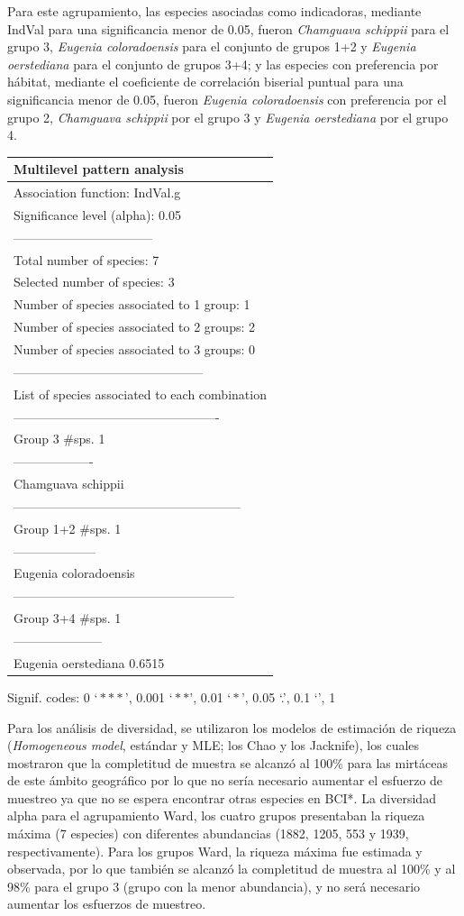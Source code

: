 \documentclass[11pt,]{article}
\begin{document}
Para este agrupamiento, las especies asociadas como indicadoras,
mediante IndVal para una significancia menor de 0.05, fueron
\emph{Chamguava schippii} para el grupo 3, \emph{Eugenia coloradoensis}
para el conjunto de grupos 1+2 y \emph{Eugenia oerstediana} para el
conjunto de grupos 3+4; y las especies con preferencia por hábitat,
mediante el coeficiente de correlación biserial puntual para una
significancia menor de 0.05, fueron \emph{Eugenia coloradoensis} con
preferencia por el grupo 2, \emph{Chamguava schippii} por el grupo 3 y
\emph{Eugenia oerstediana} por el grupo 4.

\begin{longtable}[]{@{}l@{}}
\toprule
Multilevel pattern analysis\tabularnewline
\midrule
\endhead
Association function: IndVal.g\tabularnewline
Significance level (alpha): 0.05\tabularnewline
---------------------------------\tabularnewline
Total number of species: 7\tabularnewline
Selected number of species: 3\tabularnewline
Number of species associated to 1 group: 1\tabularnewline
Number of species associated to 2 groups: 2\tabularnewline
Number of species associated to 3 groups: 0\tabularnewline
---------------------------------------------\tabularnewline
List of species associated to each combination\tabularnewline
-------------------------------------------------\tabularnewline
Group 3 \#sps. 1\tabularnewline
-------------------\tabularnewline
Chamguava schippii\tabularnewline
------------------------------------------------------\tabularnewline
Group 1+2 \#sps. 1\tabularnewline
--------------------\tabularnewline
Eugenia coloradoensis\tabularnewline
-----------------------------------------------------\tabularnewline
Group 3+4 \#sps. 1\tabularnewline
---------------------\tabularnewline
Eugenia oerstediana 0.6515\tabularnewline
\bottomrule
\end{longtable}

Signif. codes: 0 \(‘***’\), 0.001 \(‘**’\), 0.01 \(‘*’\), 0.05 `.', 0.1
`', 1

Para los análisis de diversidad, se utilizaron los modelos de estimación
de riqueza (\emph{Homogeneous model}, estándar y MLE; los Chao y los
Jacknife), los cuales mostraron que la completitud de muestra se alcanzó
al 100\% para las mirtáceas de este ámbito geográfico por lo que no
sería necesario aumentar el esfuerzo de muestreo ya que no se espera
encontrar otras especies en BCI*. La diversidad alpha para el
agrupamiento Ward, los cuatro grupos presentaban la riqueza máxima (7
especies) con diferentes abundancias (1882, 1205, 553 y 1939,
respectivamente). Para los grupos Ward, la riqueza máxima fue estimada y
observada, por lo que también se alcanzó la completitud de muestra al
100\% y al 98\% para el grupo 3 (grupo con la menor abundancia), y no
será necesario aumentar los esfuerzos de muestreo.
\end{document}
